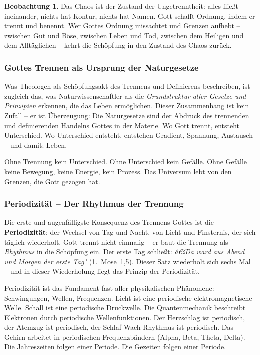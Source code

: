 ﻿\documentclass[a4paper,12pt]{article}
\theoremstyle{definition}
\newtheorem{observation}{Beobachtung}[section]
\begin{document}
\begin{observation}
	Das Chaos ist der Zustand der Ungetrenntheit: alles fließt ineinander, nichts
	hat Kontur, nichts hat Namen. Gott schafft Ordnung, indem er trennt und benennt.
	Wer Gottes Ordnung missachtet und Grenzen aufhebt -- zwischen Gut und Böse,
	zwischen Leben und Tod, zwischen dem Heiligen und dem Alltäglichen -- kehrt
	die Schöpfung in den Zustand des Chaos zurück.
\end{observation}

\subsubsection{Gottes Trennen als Ursprung der Naturgesetze}

Was Theologen als Schöpfungsakt des Trennens und Definierens beschreiben, ist
zugleich das, was Naturwissenschaftler als die \textit{Grundstruktur aller Gesetze
	und Prinzipien} erkennen, die das Leben ermöglichen. Dieser Zusammenhang ist kein
Zufall -- er ist Überzeugung: Die Naturgesetze sind der Abdruck des trennenden
und definierenden Handelns Gottes in der Materie. Wo Gott trennt, entsteht
Unterschied. Wo Unterschied entsteht, entstehen Gradient, Spannung, Austausch --
und damit: Leben.

Ohne Trennung kein Unterschied. Ohne Unterschied kein Gefälle. Ohne Gefälle keine
Bewegung, keine Energie, kein Prozess. Das Universum lebt von den Grenzen, die
Gott gezogen hat.

\subsubsection{Periodizität -- Der Rhythmus der Trennung}

Die erste und augenfälligste Konsequenz des Trennens Gottes ist die
\textbf{Periodizität}: der Wechsel von Tag und Nacht, von Licht und Finsternis,
der sich täglich wiederholt. Gott trennt nicht einmalig -- er baut die Trennung
als \textit{Rhythmus} in die Schöpfung ein. Der erste Tag schließt: \textit{â€žDa
	ward aus Abend und Morgen der erste Tag"} (1.~Mose~1,5). Dieser Satz wiederholt
sich sechs Mal -- und in dieser Wiederholung liegt das Prinzip der Periodizität.

Periodizität ist das Fundament fast aller physikalischen Phänomene: Schwingungen,
Wellen, Frequenzen. Licht ist eine periodische elektromagnetische Welle. Schall
ist eine periodische Druckwelle. Die Quantenmechanik beschreibt Elektronen durch
periodische Wellenfunktionen. Der Herzschlag ist periodisch, der Atemzug ist
periodisch, der Schlaf-Wach-Rhythmus ist periodisch. Das Gehirn arbeitet in
periodischen Frequenzbändern (Alpha, Beta, Theta, Delta). Die Jahreszeiten folgen
einer Periode. Die Gezeiten folgen einer Periode.
\end{document}
